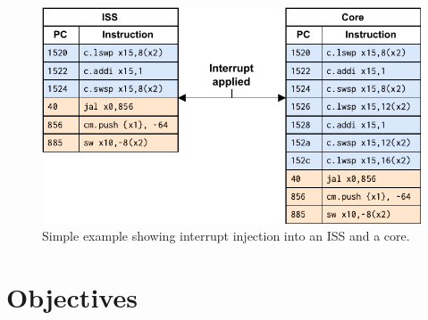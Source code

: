 \begin{figure}
    \centering
    \includegraphics[width=0.75\linewidth]{figures/lw_add_sw_example.pdf}
    \caption{Simple example showing interrupt injection into an ISS and a core.}
    \label{fig:lw_example}
\end{figure}





%



%
%


%    

\section{Objectives}


